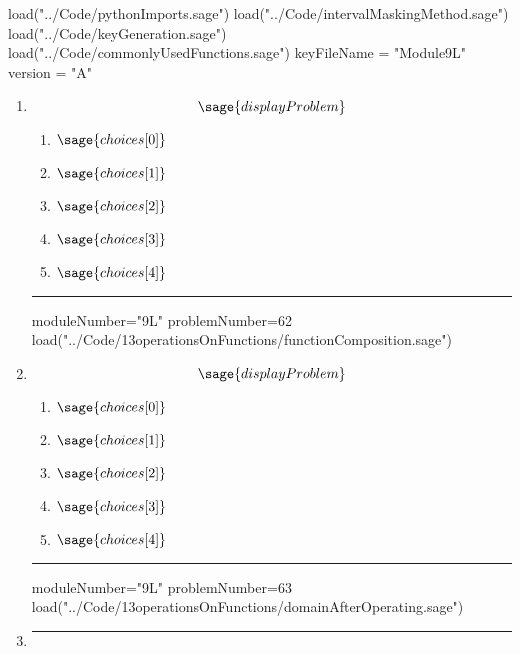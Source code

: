 \documentclass[14pt]{extbook}
\newcommand{\litem}[1]{\item#1\hspace*{-1cm}\rule{\textwidth}{0.4pt}}
\begin{document}
\pagestyle{fancy}

\begin{sagesilent}
load("../Code/pythonImports.sage")
load("../Code/intervalMaskingMethod.sage")
load("../Code/keyGeneration.sage")
load("../Code/commonlyUsedFunctions.sage")
keyFileName = "Module9L"
version = "A"
\end{sagesilent}

\begin{enumerate}

\begin{sagesilent}
moduleNumber="9L"
problemNumber=61
load("../Code/13operationsOnFunctions/determine1to1.sage")
\end{sagesilent}

\litem{ 

   \[ \sage{displayProblem} \]

  	\begin{enumerate}[label=\Alph*.]
    \item \( \sage{choices[0]} \)
    \item \( \sage{choices[1]} \)
    \item \( \sage{choices[2]} \)
    \item \( \sage{choices[3]} \)
    \item \( \sage{choices[4]} \)
  	\end{enumerate}
  }
\begin{sagesilent}
moduleNumber="9L"
problemNumber=62
load("../Code/13operationsOnFunctions/functionComposition.sage")
\end{sagesilent}

\litem{ 

   \[ \sage{displayProblem} \]

  	\begin{enumerate}[label=\Alph*.]
    \item \( \sage{choices[0]} \)
    \item \( \sage{choices[1]} \)
    \item \( \sage{choices[2]} \)
    \item \( \sage{choices[3]} \)
    \item \( \sage{choices[4]} \)
  	\end{enumerate}
  }
\begin{sagesilent}
moduleNumber="9L"
problemNumber=63
load("../Code/13operationsOnFunctions/domainAfterOperating.sage")
\end{sagesilent}

\litem{ 

}
\end{enumerate}
\end{document}

